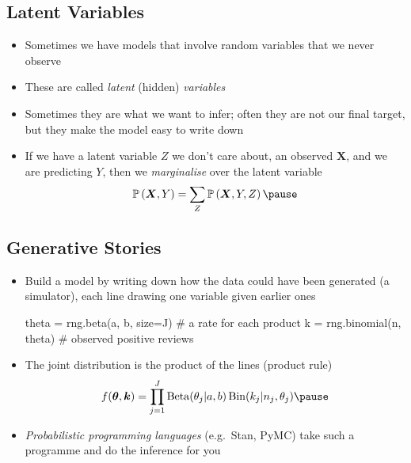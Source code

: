 
\begin{slide}
\section{Latent Variables}

\begin{PauseHighLight}
  \begin{itemize}
  \item Sometimes we have models that involve random variables that we
    never observe\pause
  \item These are called \emph{latent} (hidden) \emph{variables}\pause
  \item Sometimes they are what we want to infer; often they are not our
    final target, but they make the model easy to write down\pause
  \item If we have a latent variable $Z$ we don't care about, an
    observed $\bm{X}$, and we are predicting $Y$, then we
    \emph{marginalise} over the latent variable
    \begin{align*}
      \Prob{\bm{X}, Y} = \sum_Z \Prob{\bm{X}, Y, Z}\pause
    \end{align*}
  \end{itemize}
\end{PauseHighLight}

\end{slide}


\begin{slide}
\section[-2]{Generative Stories}

\begin{PauseHighLight}
  \begin{itemize}\squeeze
  \item Build a model by writing down how the data could have been
    generated (a simulator), each line drawing one variable given
    earlier ones\pause
\begin{python}
theta = rng.beta(a, b, size=J)    # a rate for each product
k = rng.binomial(n, theta)        # observed positive reviews
\end{python}\pause
  \item The joint distribution is the product of the lines (product
    rule)
    \begin{align*}
      f(\bm{\theta},\bm{k}) = \prod_{j=1}^J
      \mathrm{Beta}(\theta_j|a,b)\,\mathrm{Bin}(k_j|n_j,\theta_j)\pause
    \end{align*}
  \item \emph{Probabilistic programming languages} (e.g.\ Stan, PyMC)
    take such a programme and do the inference for you\pause
  \end{itemize}
\end{PauseHighLight}

\end{slide}

